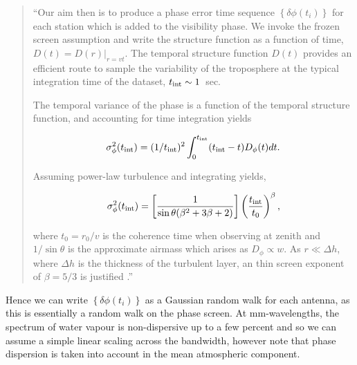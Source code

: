 \begin{quotation}
``Our aim then is to produce a phase error time sequence $\left\{\delta \phi(t_i)\right\}$ for each station which is added to the visibility phase. We invoke the frozen screen assumption and write the structure function as a function of time, ${D (t) =  D(r)|_{r=vt}}$. The temporal structure function $D(t)$ provides an efficient route to sample the variability of the troposphere at the typical integration time of the dataset, $t_{\rm int} \sim 1$~sec. 

The temporal variance of the phase is a function of the temporal structure function, and accounting for time integration yields \citep*[see][B3]{Treuhaft_1987} 

\begin{equation}
\sigma^2_{\phi}(t_{\rm int}) = (1/t_{\rm int})^2 \int_{0}^{t_{\rm int}} (t_{\rm int}-t) D_{\phi}(t) dt.
\end{equation}

Assuming power-law turbulence and integrating yields, 

\begin{equation}\label{eq:turb_final}
\sigma^2_\phi (t_{\rm int})=\left[\frac{1}{\sin\theta(\beta^2 +3\beta +2)}\right]\left(\frac{t_{\rm int}}{t_0}\right)^{\beta},
\end{equation}


\noindent where $t_0 = r_0/v$ is the coherence time when observing at zenith and $1/\sin\theta$ is the approximate airmass which arises as $D_\phi \propto w$. As $r \ll \Delta h$, where $\Delta h$ is the thickness of the turbulent layer, an thin screen exponent of $\beta = 5/3$ is justified \citep*{Treuhaft_1987}.''\\
\citep{Blecher_2016}
\end{quotation}


Hence we can write $\left\{\delta \phi(t_i)\right\}$ as a Gaussian random walk for each antenna, as this is essentially a random walk on the phase screen. At mm-wavelengths, the spectrum of water vapour is non-dispersive up to a few percent \citep{Curtis_2009} and so we can assume a simple linear scaling across the bandwidth, however note that phase dispersion is taken into account in the mean atmospheric component.

